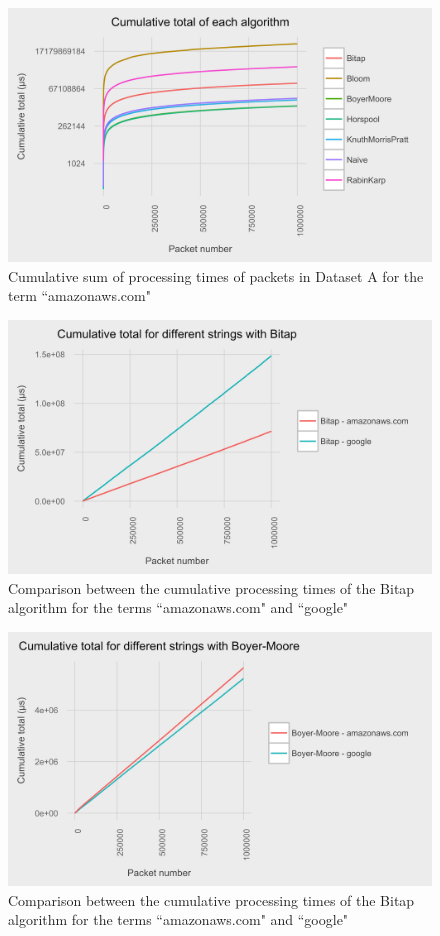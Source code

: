 \documentclass{article}
\begin{document}
\begin{figure}[h!bt]
  \centering
  \includegraphics[width=\textwidth]{graphs/cum_sum_packets_amazonaws-com.png}
  \caption{Cumulative sum of processing times of packets in Dataset A for the term ``amazonaws.com"}
\end{figure}

\begin{figure}[h!bt]
  \centering
  \includegraphics[width=\textwidth]{graphs/term_length_compare-bitap.png}
  \caption{Comparison between the cumulative processing times of the Bitap algorithm for the terms ``amazonaws.com" and ``google"}
\end{figure}

\begin{figure}[h!bt]
  \centering
  \includegraphics[width=\textwidth]{graphs/term_length_compare-boyer-moore.png}
  \caption{Comparison between the cumulative processing times of the Bitap algorithm for the terms ``amazonaws.com" and ``google"}
\end{figure}
\end{document}
